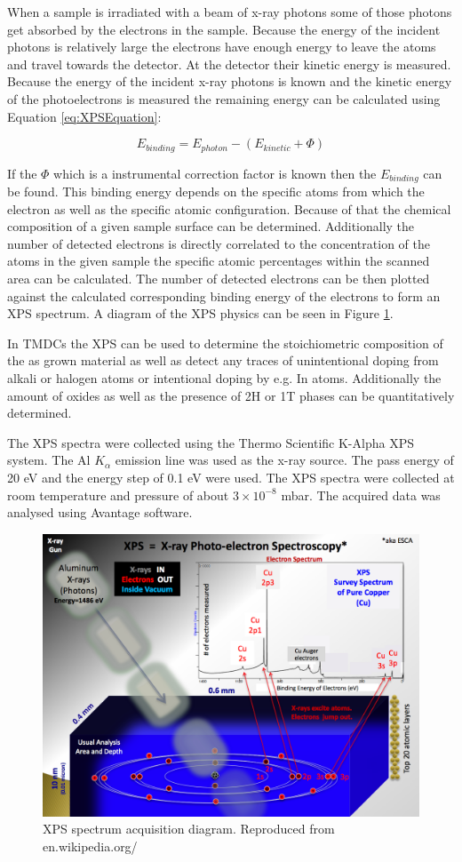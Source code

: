 When a sample is irradiated with a beam of x-ray photons some of those photons get absorbed by the electrons in the sample. Because the energy of the incident photons is relatively large the electrons have enough energy to leave the atoms and travel towards the detector. At the detector their kinetic energy is measured. Because the energy of the incident x-ray photons is known and the kinetic energy of the photoelectrons is measured the remaining energy can be calculated using Equation \ref{eq:XPSEquation}:

\begin{equation}
E_{binding}  = E_{photon} - (E_{kinetic} + \Phi)
\label{eq:XPSEquation}
\end{equation}

If the $\Phi$ which is a instrumental correction factor is known then the $E_{binding}$ can be found. This binding energy depends on the specific atoms from which the electron as well as the specific atomic configuration. Because of that the chemical composition of a given sample surface can be determined. Additionally the number of detected electrons is directly correlated to the concentration of the atoms in the given sample the specific atomic percentages within the scanned area can be calculated. The number of detected electrons can be then plotted against the calculated corresponding binding energy of the electrons to form an XPS spectrum. A diagram of the XPS physics can be seen in Figure \ref{fig:MethodologyXPSSetup}.

In TMDCs the XPS can be used to determine the stoichiometric composition of the as grown material as well as detect any traces of unintentional doping from alkali or halogen atoms or intentional doping by e.g. In atoms. Additionally the amount of oxides as well as the presence of 2H or 1T phases can be quantitatively determined. 

The XPS spectra were collected using the Thermo Scientific K-Alpha XPS system. The Al $K_{\alpha}$ emission line was used as the x-ray source. The pass energy of 20 eV and the energy step of 0.1 eV were used. The XPS spectra were collected at room temperature and pressure of about $3 \times 10^{-8}$ mbar. The acquired data was analysed using Avantage software.

\begin{figure}[!h]
	\begin{center}
		\includegraphics[scale=0.3]{Methodology/XPSSetup.png}
		\caption{XPS spectrum acquisition diagram. Reproduced from en.wikipedia.org/}
		\label{fig:MethodologyXPSSetup}
	\end{center}
\end{figure}